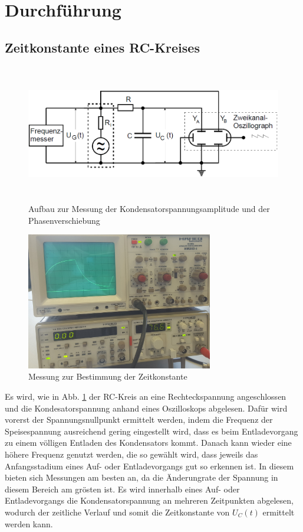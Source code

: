 \section{Durchführung}
\label{sec:Durchführung}

\subsection{Zeitkonstante eines RC-Kreises}

\begin{figure}
    \centering
    \includegraphics[height=6cm]{data/bild_4}
    \caption{Aufbau zur Messung der Kondensatorspannungsamplitude und der Phasenverschiebung}
    \label{fig:bild_4}
\end{figure}

\begin{figure}
    \centering
    \includegraphics[height=6cm]{data/a_zeitkonstante}
    \caption{Messung zur Bestimmung der Zeitkonstante}
    \label{fig:a_zeit}
\end{figure}

Es wird, wie in Abb. \ref{fig:bild_4} der RC-Kreis an eine Rechteckspannung angeschlossen und die Kondesatorspannung 
anhand eines Oszilloskops abgelesen. Dafür wird vorerst der Spannungsnullpunkt ermittelt werden, indem die Frequenz der 
Speisespannung ausreichend gering eingestellt wird, dass es beim Entladevorgang zu einem völligen Entladen des Kondensators kommt. 
Danach kann wieder eine höhere Frequenz genutzt werden, die so gewählt wird, dass jeweils das Anfangsstadium eines Auf- oder 
Entladevorgangs gut so erkennen ist. In diesem bieten sich Messungen am besten an, da die Änderungrate der Spannung in diesem 
Bereich am grösten ist.
Es wird innerhalb eines Auf- oder Entladevorgangs die Kondensatorspannung an mehreren Zeitpunkten abgelesen, wodurch der zeitliche 
Verlauf und somit die Zeitkonstante von $U_C (t)$ ermittelt werden kann.

